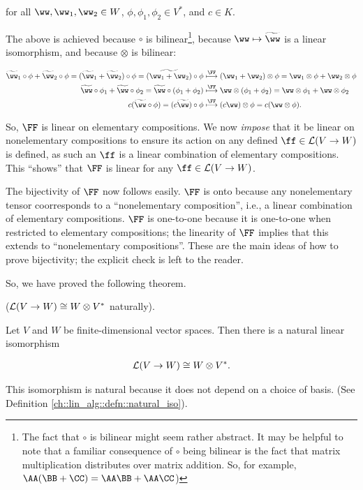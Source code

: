 \begin{deriv}
    for all $\ww, \ww_1, \ww_2 \in W$, $\phi, \phi_1, \phi_2 \in V^*$, and $c \in K$.
    
    The above is achieved because $\circ$ is bilinear\footnote{The fact that $\circ$ is bilinear might seem rather abstract. It may be helpful to note that a familiar consequence of $\circ$ being bilinear is the fact that matrix multiplication distributes over matrix addition. So, for example, $\AA(\BB + \CC) = \AA \BB + \AA \CC$)}, because $\ww \mapsto \tww$ is a linear isomorphism, and because $\otimes$ is bilinear:
    
    \begin{align*}
        \tww_1 \circ \phi + \tww_2 \circ \phi 
        = (\tww_1 + \tww_2) \circ \phi
        = \widetilde{(\ww_1 + \ww_2)} \circ \phi
        &\overset{\FF}{\longmapsto}
        (\ww_1 + \ww_2) \otimes \phi = \ww_1 \otimes \phi + \ww_2 \otimes \phi
        \\
        \tww \circ \phi_1 + \tww \circ \phi_2 
        = \tww \circ (\phi_1 + \phi_2)
        &\overset{\FF}{\longmapsto}
        \ww \otimes (\phi_1 + \phi_2)
        = \ww \otimes \phi_1 + \ww \otimes \phi_2
        \\
        c (\tww \circ \phi)
        = (c \tww) \circ \phi
        &\overset{\FF}{\longmapsto}
        (c \ww) \otimes \phi
        = c (\ww \otimes \phi).
    \end{align*}
    
    So, $\FF$ is linear on elementary compositions. We now \textit{impose} that it be linear on nonelementary compositions to ensure its action on any defined $\ff \in \LLLL(V \rightarrow W)$ is defined, as such an $\ff$ is a linear combination of elementary compositions. This ``shows'' that $\FF$ is linear for any $\ff \in \LLLL(V \rightarrow W)$.
    
    The bijectivity of $\FF$ now follows easily. $\FF$ is onto because any nonelementary tensor coorresponds to a ``nonelementary composition'', i.e., a linear combination of elementary compositions. $\FF$ is one-to-one because it is one-to-one when restricted to elementary compositions; the linearity of $\FF$ implies that this extends to ``nonelementary compositions''. These are the main ideas of how to prove bijectivity; the explicit check is left to the reader.
\end{deriv}

So, we have proved the following theorem.

\begin{theorem}
\label{ch::motivated_intro::thm::lin_V_W_iso_W_otimes_V}
    ($\mathcal{L}(V \rightarrow W) \cong W \otimes V^*$ naturally). 
    
    Let $V$ and $W$ be finite-dimensional vector spaces. Then there is a natural linear isomorphism
    
    \begin{align*}
        \mathcal{L}(V \rightarrow W) \cong W \otimes V^*.
    \end{align*}
    
    This isomorphism is natural because it does not depend on a choice of basis. (See Definition \ref{ch::lin_alg::defn::natural_iso}).
\end{theorem}

